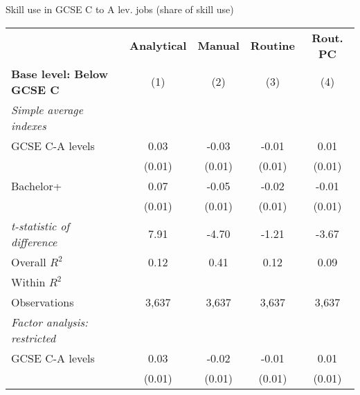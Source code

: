\begin{center}
\begin{threeparttable}[!h]
\caption{Skill use in GCSE C to A lev. jobs (share of skill use)}
\label{tab:skillRegs}
\begin{tabular}{lcccc}
\toprule
\toprule
&\multicolumn{1}{c}{\textbf{Analytical}}&\multicolumn{1}{c}{\textbf{Manual}}&\multicolumn{1}{c}{\textbf{Routine}}&\multicolumn{1}{c}{\textbf{Rout. PC}} \\
\textbf{Base level: Below GCSE C}&\multicolumn{1}{c}{(1)}&\multicolumn{1}{c}{(2)}&\multicolumn{1}{c}{(3)}&\multicolumn{1}{c}{(4)} \\
\midrule
\textit{Simple average indexes}\vspace{1mm} \\ 
\hspace{3mm}GCSE C-A levels&        0.03\sym{***}&       -0.03\sym{***}&       -0.01         &        0.01         \\
                    &      (0.01)         &      (0.01)         &      (0.01)         &      (0.01)         \\
\hspace{3mm}Bachelor+&        0.07\sym{***}&       -0.05\sym{***}&       -0.02\sym{*}  &       -0.01         \\
                    &      (0.01)         &      (0.01)         &      (0.01)         &      (0.01)         \\
\textit{t-statistic of difference}&        7.91         &       -4.70         &       -1.21         &       -3.67         \\
\midrule Overall $ R^2$&        0.12         &        0.41         &        0.12         &        0.09         \\
Within $ R^2$       &                     &                     &                     &                     \\
Observations        &       3,637         &       3,637         &       3,637         &       3,637         \\
\midrule \vspace{1mm}\textit{Factor analysis: restricted} \\ 
\hspace{3mm}GCSE C-A levels&        0.03\sym{***}&       -0.02\sym{***}&       -0.01         &        0.01         \\
                    &      (0.01)         &      (0.01)         &      (0.01)         &      (0.01)         \\

\end{tabular}
\end{threeparttable}
\end{center}

